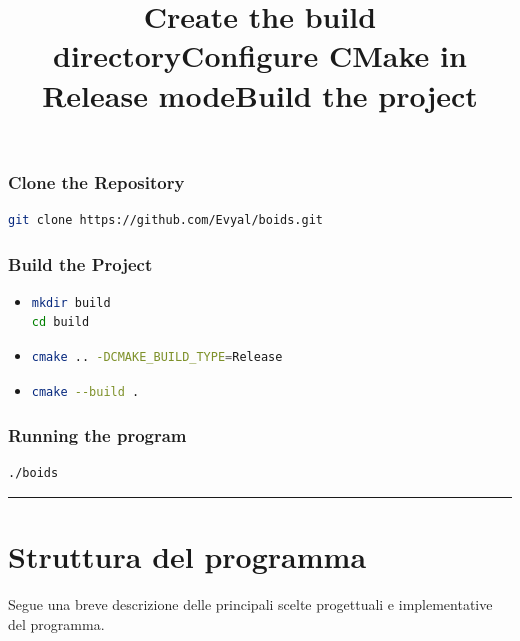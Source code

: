\documentclass[10pt,a4paper]{article}
\begin{document}
\subsubsection{Clone the Repository}

\begin{lstlisting}[language=bash]
git clone https://github.com/Evyal/boids.git
\end{lstlisting}

\subsubsection{Build the Project}

\begin{itemize}
    \item \title{\textbf{Create the build directory}}

\begin{lstlisting}[language=bash]
mkdir build
cd build
\end{lstlisting}

\item \title{\textbf{Configure CMake in Release mode}}

\begin{lstlisting}[language=bash]
cmake .. -DCMAKE_BUILD_TYPE=Release
\end{lstlisting}

\item \title{\textbf{Build the project}} 

\begin{lstlisting}[language=bash]
cmake --build .
\end{lstlisting}
\end{itemize}


\subsubsection{Running the program} 

\begin{lstlisting}[language=bash]
./boids
\end{lstlisting}

\par\noindent\rule{\textwidth}{0.4pt}

\newpage

\section{Struttura del programma}
Segue una breve descrizione delle principali scelte progettuali e implementative del programma.
\end{document}
